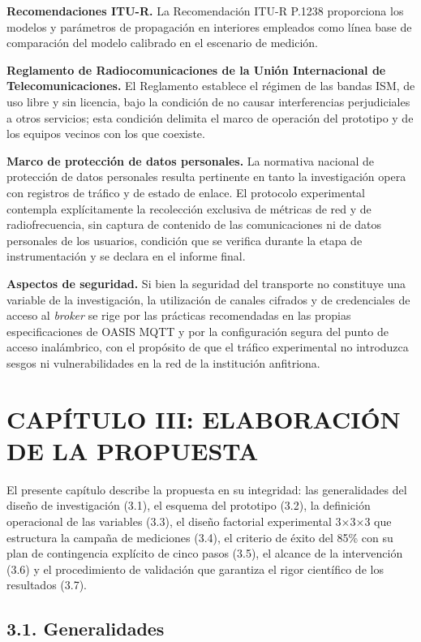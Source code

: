 \documentclass[
  12pt,
]{article}
\begin{document}
\textbf{Recomendaciones ITU-R.} La Recomendación ITU-R P.1238
proporciona los modelos y parámetros de propagación en interiores
empleados como línea base de comparación del modelo calibrado en el
escenario de medición.

\textbf{Reglamento de Radiocomunicaciones de la Unión Internacional de
Telecomunicaciones.} El Reglamento establece el régimen de las bandas
ISM, de uso libre y sin licencia, bajo la condición de no causar
interferencias perjudiciales a otros servicios; esta condición delimita
el marco de operación del prototipo y de los equipos vecinos con los que
coexiste.

\textbf{Marco de protección de datos personales.} La normativa nacional
de protección de datos personales resulta pertinente en tanto la
investigación opera con registros de tráfico y de estado de enlace. El
protocolo experimental contempla explícitamente la recolección exclusiva
de métricas de red y de radiofrecuencia, sin captura de contenido de las
comunicaciones ni de datos personales de los usuarios, condición que se
verifica durante la etapa de instrumentación y se declara en el informe
final.

\textbf{Aspectos de seguridad.} Si bien la seguridad del transporte no
constituye una variable de la investigación, la utilización de canales
cifrados y de credenciales de acceso al \emph{broker} se rige por las
prácticas recomendadas en las propias especificaciones de OASIS MQTT y
por la configuración segura del punto de acceso inalámbrico, con el
propósito de que el tráfico experimental no introduzca sesgos ni
vulnerabilidades en la red de la institución anfitriona.

\section{CAPÍTULO III: ELABORACIÓN DE LA
PROPUESTA}\label{capuxedtulo-iii-elaboraciuxf3n-de-la-propuesta}

El presente capítulo describe la propuesta en su integridad: las
generalidades del diseño de investigación (3.1), el esquema del
prototipo (3.2), la definición operacional de las variables (3.3), el
diseño factorial experimental 3×3×3 que estructura la campaña de
mediciones (3.4), el criterio de éxito del 85\% con su plan de
contingencia explícito de cinco pasos (3.5), el alcance de la
intervención (3.6) y el procedimiento de validación que garantiza el
rigor científico de los resultados (3.7).

\subsection{3.1. Generalidades}\label{generalidades}
\end{document}
